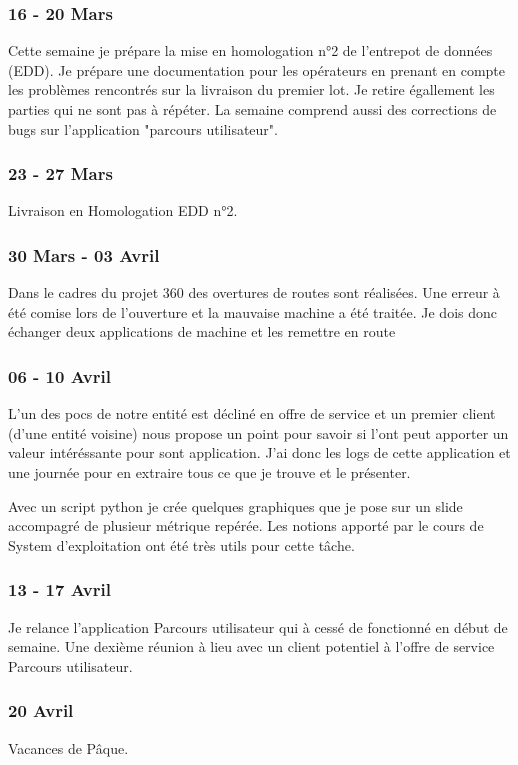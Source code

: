 \subsubsection*{16 - 20 Mars}
Cette semaine je prépare la mise en homologation n°2 de l'entrepot de données (EDD). Je prépare une documentation pour les opérateurs en prenant en compte les problèmes rencontrés sur la livraison du premier lot. Je retire égallement les parties qui ne sont pas à répéter. La semaine comprend aussi des corrections de bugs sur l'application "parcours utilisateur".

\subsubsection*{23 - 27 Mars}
Livraison en Homologation EDD n°2.

\subsubsection*{30 Mars - 03 Avril}
Dans le cadres du projet 360 des overtures de routes sont réalisées. Une erreur à été comise lors de l'ouverture et la mauvaise machine a été traitée. Je dois donc échanger deux applications de machine et les remettre en route

\subsubsection*{06 - 10 Avril}
L'un des pocs de notre entité est décliné en offre de service et un premier client (d'une entité voisine) nous propose un point pour savoir si l'ont peut apporter un valeur intéréssante pour sont application.
J'ai donc les logs de cette application et une journée pour en extraire tous ce que je trouve et le présenter. 

Avec un script python je crée quelques graphiques que je pose sur un slide accompagré de plusieur métrique repérée. Les notions apporté par le cours de System d'exploitation ont été très utils pour cette tâche.

\subsubsection*{13 - 17 Avril}
Je relance l'application Parcours utilisateur qui à cessé de fonctionné en début de semaine. Une dexième réunion à lieu avec un client potentiel à l'offre de service Parcours utilisateur.

\subsubsection*{20 Avril}
Vacances de Pâque.

